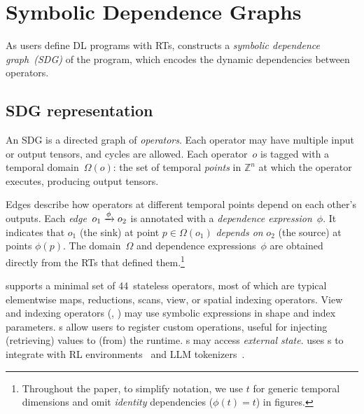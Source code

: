 


\section{Symbolic Dependence Graphs}
\label{sec:pdg_and_transformations}

As users define DL programs with RTs, \sys constructs a \emph{symbolic dependence graph~(SDG)} of the program, which encodes the dynamic dependencies between operators.


\subsection{SDG representation}
\label{sec:pdg}

An SDG is a directed graph of \emph{operators}. Each operator may have multiple input or output tensors, and cycles are allowed. 
Each operator~$o$ is tagged with a temporal domain~$\Omega(o)$: the set of temporal \emph{points} in $\mathbb{Z}^{n}$ at which the operator executes, producing output tensors. 

Edges describe how operators at different temporal points depend on each other’s outputs.
Each \emph{edge}~$o_1\xrightarrow{\smash{\phi}}o_2$ is annotated with a \emph{dependence expression}~$\phi$. It indicates that $o_1$ (the sink) at point $p \in \Omega(o_1)$ \emph{depends on} $o_2$ (the source) at points $\phi(p)$. 
The domain~$\Omega$ and dependence expressions~$\phi$ are obtained directly from the RTs that defined them.\footnote{Throughout the paper, to simplify notation, we use $t$ for generic temporal dimensions and  omit \emph{identity} dependencies (\ie $\phi(t)=t$) in figures.}

 \sys{} supports a minimal set of 44~stateless operators, most of which are typical elementwise maps, reductions, scans, view, or spatial indexing operators. View and indexing operators (\eg {}, ) may use symbolic expressions in shape and index parameters. 
s allow users to register custom operations, useful for injecting (retrieving) values to (from) the runtime. s may access \emph{external state}. \sys{} uses s to integrate with RL environments~\cite{brockman2016openai} and LLM tokenizers~\cite{kudo2018sentencepiece}.

